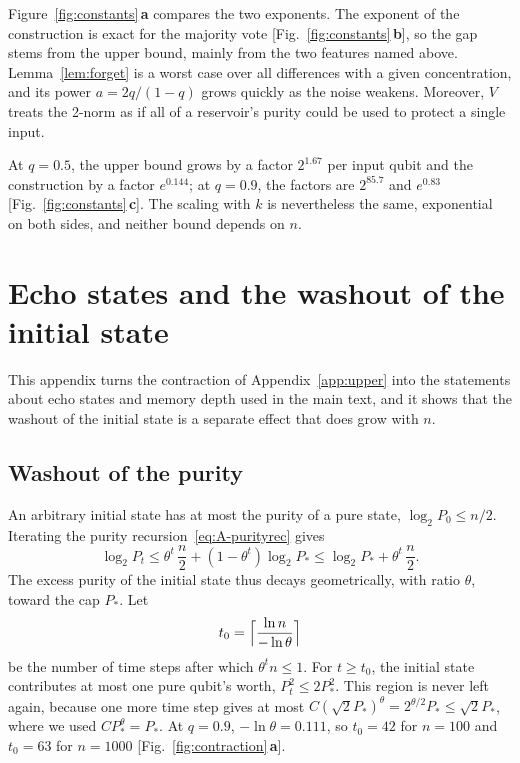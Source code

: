 \documentclass[aps,pra,reprint,superscriptaddress,floatfix]{revtex4-2}
\theoremstyle{plain}
\newcommand{\pnl}[1]{\textsf{\textbf{#1}}}
\begin{document}
Figure~\ref{fig:constants}\,\pnl{a} compares the two exponents. The exponent of the construction is exact for the majority vote [Fig.~\ref{fig:constants}\,\pnl{b}], so the gap stems from the upper bound, mainly from the two features named above. Lemma~\ref{lem:forget} is a worst case over all differences with a given concentration, and its power $a=2q/(1-q)$ grows quickly as the noise weakens. Moreover, $V$ treats the 2-norm as if all of a reservoir's purity could be used to protect a single input.

At $q=0.5$, the upper bound grows by a factor $2^{1.67}$ per input qubit and the construction by a factor $e^{0.144}$; at $q=0.9$, the factors are $2^{85.7}$ and $e^{0.83}$ [Fig.~\ref{fig:constants}\,\pnl{c}]. The scaling with $k$ is nevertheless the same, exponential on both sides, and neither bound depends on $n$.

\section{Echo states and the washout of the initial state}
\label{app:washout}

This appendix turns the contraction of Appendix~\ref{app:upper} into the statements about echo states and memory depth used in the main text, and it shows that the washout of the initial state is a separate effect that does grow with $n$.

\subsection{Washout of the purity}

An arbitrary initial state has at most the purity of a pure state, $\log_2P_0\le n/2$. Iterating the purity recursion~\eqref{eq:A-purityrec} gives
\begin{equation}
\log_2P_t\le\theta^t\,\frac n2+(1-\theta^t)\log_2P_*\le\log_2P_*+\theta^t\,\frac n2 .
\label{eq:A-washout}
\end{equation}
The excess purity of the initial state thus decays geometrically, with ratio $\theta$, toward the cap $P_*$. Let
\begin{equation}
t_0=\Bigl\lceil\frac{\ln n}{-\ln\theta}\Bigr\rceil
\end{equation}
be the number of time steps after which $\theta^tn\le1$. For $t\ge t_0$, the initial state contributes at most one pure qubit's worth, $P_t^2\le2P_*^2$. This region is never left again, because one more time step gives at most $C(\sqrt2P_*)^\theta=2^{\theta/2}P_*\le\sqrt2P_*$, where we used $CP_*^\theta=P_*$. At $q=0.9$, $-\ln\theta=0.111$, so $t_0=42$ for $n=100$ and $t_0=63$ for $n=1000$ [Fig.~\ref{fig:contraction}\,\pnl{a}].
\end{document}
